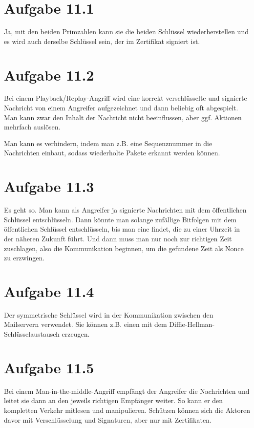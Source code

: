 \documentclass[10pt,a4paper]{article}
\begin{document}
\section{Aufgabe 11.1}

Ja, mit den beiden Primzahlen kann sie die beiden Schlüssel wiederherstellen und
es wird auch derselbe Schlüssel sein, der im Zertifikat signiert ist.

\section{Aufgabe 11.2}

Bei einem Playback/Replay-Angriff wird eine korrekt verschlüsselte und signierte
Nachricht von einem Angreifer aufgezeichnet und dann beliebig oft
abgespielt. Man kann zwar den Inhalt der Nachricht nicht beeinflussen, aber
ggf. Aktionen mehrfach auslösen.

Man kann es verhindern, indem man z.B. eine Sequenznummer in die Nachrichten
einbaut, sodass wiederholte Pakete erkannt werden können.

\section{Aufgabe 11.3}

Es geht so. Man kann als Angreifer ja signierte Nachrichten mit dem öffentlichen
Schlüssel entschlüsseln. Dann könnte man solange zufällige Bitfolgen mit dem
öffentlichen Schlüssel entschlüsseln, bis man eine findet, die zu einer Uhrzeit
in der näheren Zukunft führt. Und dann muss man nur noch zur richtigen Zeit
zuschlagen, also die Kommunikation beginnen, um die gefundene Zeit als Nonce zu
erzwingen.

\section{Aufgabe 11.4}

Der symmetrische Schlüssel wird in der Kommunikation zwischen den Mailservern
verwendet. Sie können z.B. einen mit dem Diffie-Hellman-Schlüsselaustausch
erzeugen.

\section{Aufgabe 11.5}

Bei einem Man-in-the-middle-Angriff empfängt der Angreifer die Nachrichten und
leitet sie dann an den jeweils richtigen Empfänger weiter. So kann er den
kompletten Verkehr mitlesen und manipulieren. Schützen können sich die Aktoren
davor mit Verschlüsselung und Signaturen, aber nur mit Zertifikaten.
\end{document}
